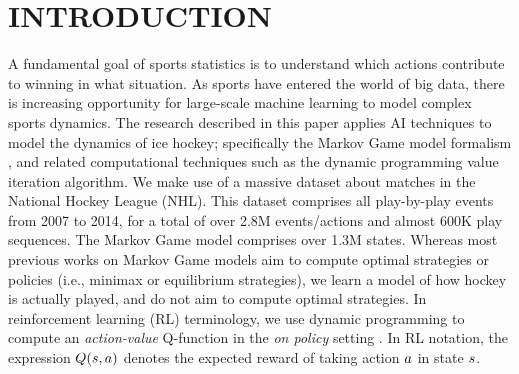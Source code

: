 \documentclass[]{article}
\begin{document}




\section{INTRODUCTION}

A fundamental goal of sports statistics is to understand which actions contribute to winning in what situation. As sports have entered the world of big data, there is increasing opportunity for large-scale machine learning to model complex sports dynamics. The research described in this paper applies AI techniques to model the dynamics of ice  hockey; specifically the Markov Game model formalism \citep{Littman1994}, and related computational techniques such as the dynamic programming value iteration algorithm. We make use of a massive dataset about matches in the National  Hockey League (NHL). This dataset comprises all play-by-play events from 2007 to 2014, for a total of over 2.8M events/actions and almost 600K play sequences.
The Markov Game model comprises over 1.3M states. Whereas most previous works on Markov Game models aim to compute optimal strategies or policies \citep{Littman1994} (i.e., minimax or equilibrium strategies), we learn a model of how hockey is actually played, and do not aim to compute optimal strategies. In reinforcement learning (RL) terminology, we use dynamic programming to compute an {\em action-value} Q-function in the {\em on policy} setting \citep{bib:sutton}. In RL notation, the expression $Q(s,a)$ denotes the expected reward of taking action $a$ in state $s$.
\end{document}
